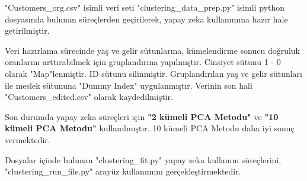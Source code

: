 "Customers\_org.csv" isimli veri seti "clustering\_data\_prep.py" isimli python dosyasında bulunan süreçlerden geçirilerek, yapay zeka kullanımına hazır hale getirilmiştir. 

Veri hazırlama sürecinde yaş ve gelir sütunlarına, kümelendirme sonucu doğruluk oranlarını arttırabilmek için gruplandırma yapılmıştır. Cinsiyet sütunu 1 - 0 olarak "Map"lenmiştir. ID sütunu silinmiştir. Gruplandırılan yaş ve gelir sütunları ile meslek sütununa "Dummy Index" uygulanmıştır. Verinin son hali "Customers\_edited.csv" olarak kaydedilmiştir.

Son durumda yapay zeka süreçleri için \textbf{"2 kümeli PCA Metodu"} ve \textbf{"10 kümeli PCA Metodu"} kullanılmıştır. 10 kümeli PCA Metodu daha iyi sonuç vermektedir.

Dosyalar içinde bulunan "clustering\_fit.py" yapay zeka kullanım süreçlerini, "clustering\_run\_file.py" arayüz kullanımını gerçekleştirmektedir.